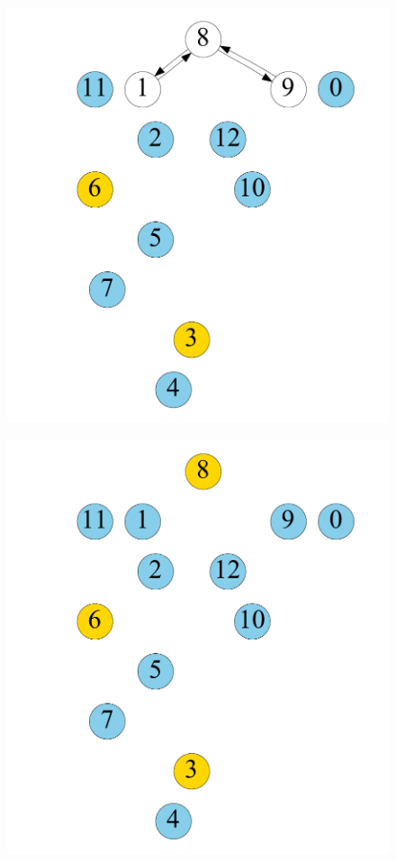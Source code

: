 \begin{figure}[t]
\begin{minipage}[b]{0.19\linewidth}
	\end{minipage}
	\begin{minipage}[b]{0.19\linewidth}
		\centering
		{\includegraphics[width=\textwidth]{./alg_fig/scc-g5}}
	\end{minipage}                  
	\begin{minipage}[b]{0.19\linewidth}
		\centering
		{\includegraphics[width=\textwidth]{./alg_fig/scc-g7}}

\end{minipage}
\end{figure}
